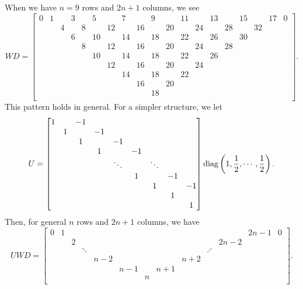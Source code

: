 When we have $n=9$ rows and $2n+1$ columns, we see
%
\begin{equation}
    WD = \begin{bmatrix}
    0 & 1 & & 3 & & 5 & & 7 & & 9 & & 11 & & 13 & & 15 & & 17 & 0 \\
    & & 4 & & 8 & & 12 & & 16 & & 20 & & 24 & & 28 & & 32 & & \\
    & & & 6 & & 10 & & 14 & & 18 & & 22 & & 26 & & 30 & & & \\
    & & & & 8 & & 12 & & 16 & & 20 & & 24 & & 28 & & & & \\
    & & & & & 10 & & 14 & & 18 & & 22 & & 26 & & & & & \\
    & & & & & & 12 & & 16 & & 20 & & 24 & & & & & & \\
    & & & & & & & 14 & & 18 & & 22 & & & & & & & \\
    & & & & & & & & 16 & & 20 & & & & & & & & \\
    & & & & & & & & & 18 & & & & & & & & & \\
    \end{bmatrix}.
\end{equation}
%
This pattern holds in general.
For a simpler structure, we let
%
\begin{equation}
    U = \begin{bmatrix}
    1  &    & -1 \\
       &  1 &    & -1 \\
       &    &  1 &    & -1 \\
       &    &    &  1 &    & -1 \\
       &    &    &    &  \ddots &    & \ddots \\
       &    &    &    &    &  1 &    & -1 \\
       &    &    &    &    &    &  1 &    & -1 \\
       &    &    &    &    &    &    &  1 &    \\
       &    &    &    &    &    &    &    &  1 \\
    \end{bmatrix}
    \operatorname{diag}\left( 1,\frac{1}{2},\cdots,\frac{1}{2} \right).
    \label{eq:vand_U_mat}
\end{equation}
%
Then, for general $n$ rows and $2n+1$ columns, we have
%
\begin{equation}
    UWD = \begin{bmatrix}
    0 & 1 &   &   &   &   &   &   &   &    &    &2n-1&  0 \\
      &   & 2 &   &   &   &   &   &   &    &2n-2&    &    \\
      &  & &\ddots&   &   &   &   &   &\iddots& &    &    \\
      &   &   &   &n-2&   &   &   &n+2&    &    &    &    \\
      &   &   &   &   &n-1&   &n+1&   &    &    &    &    \\
      &   &   &   &   &   & n &   &   &    &    &    &    \\
    \end{bmatrix}.
    \label{eq:CV_UWD_mat}
\end{equation}
